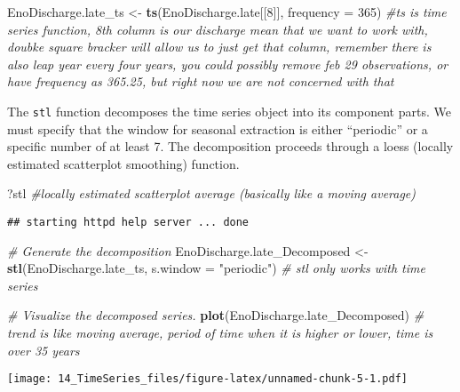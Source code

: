 \documentclass[
]{article}
\newenvironment{Shaded}{\begin{snugshade}}{\end{snugshade}}
\newcommand{\CommentTok}[1]{\textcolor[rgb]{0.56,0.35,0.01}{\textit{#1}}}
\newcommand{\DataTypeTok}[1]{\textcolor[rgb]{0.13,0.29,0.53}{#1}}
\newcommand{\DecValTok}[1]{\textcolor[rgb]{0.00,0.00,0.81}{#1}}
\newcommand{\KeywordTok}[1]{\textcolor[rgb]{0.13,0.29,0.53}{\textbf{#1}}}
\newcommand{\NormalTok}[1]{#1}
\newcommand{\StringTok}[1]{\textcolor[rgb]{0.31,0.60,0.02}{#1}}
\begin{document}
\begin{Shaded}
\begin{Highlighting}[]
\NormalTok{EnoDischarge.late\_ts <{-}}\StringTok{ }\KeywordTok{ts}\NormalTok{(EnoDischarge.late[[}\DecValTok{8}\NormalTok{]], }\DataTypeTok{frequency =} \DecValTok{365}\NormalTok{) }\CommentTok{\#ts is time series function, 8th column is our discharge mean that we want to work with, doubke square bracker will allow us to just get that column, remember there is also leap year every four years, you could possibly remove feb 29 observations, or have frequency as 365.25, but right now we are not concerned with that}
\end{Highlighting}
\end{Shaded}

The \texttt{stl} function decomposes the time series object into its
component parts. We must specify that the window for seasonal extraction
is either ``periodic'' or a specific number of at least 7. The
decomposition proceeds through a loess (locally estimated scatterplot
smoothing) function.

\begin{Shaded}
\begin{Highlighting}[]
\NormalTok{?stl }\CommentTok{\#locally estimated scatterplot average (basically like a moving average)}
\end{Highlighting}
\end{Shaded}

\begin{verbatim}
## starting httpd help server ... done
\end{verbatim}

\begin{Shaded}
\begin{Highlighting}[]
\CommentTok{\# Generate the decomposition}
\NormalTok{EnoDischarge.late\_Decomposed <{-}}\StringTok{ }\KeywordTok{stl}\NormalTok{(EnoDischarge.late\_ts, }\DataTypeTok{s.window =} \StringTok{"periodic"}\NormalTok{) }\CommentTok{\# stl only works with time series}

\CommentTok{\# Visualize the decomposed series. }
\KeywordTok{plot}\NormalTok{(EnoDischarge.late\_Decomposed) }\CommentTok{\# trend is like moving average, period of time when it is higher or lower, time is over 35 years}
\end{Highlighting}
\end{Shaded}

\texttt{[image: 14\_TimeSeries\_files/figure-latex/unnamed-chunk-5-1.pdf]}
\end{document}
